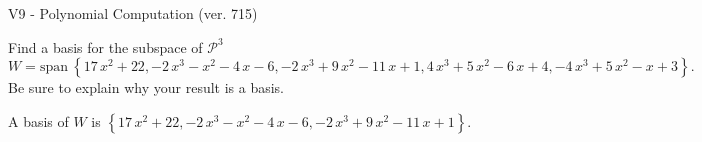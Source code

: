 \begin{exercise}
  \begin{exerciseTitle}V9 - Polynomial Computation (ver. 715)\end{exerciseTitle}
  \begin{exerciseStatement}
    Find a basis for the subspace of \(\mathcal{P}^3\) 
\[W=\mathrm{span}\ \left\{17 \, x^{2} + 22 , -2 \, x^{3} - x^{2} - 4 \, x - 6 , -2 \, x^{3} + 9 \, x^{2} - 11 \, x + 1 , 4 \, x^{3} + 5 \, x^{2} - 6 \, x + 4 , -4 \, x^{3} + 5 \, x^{2} - x + 3\right\}.\]
 Be sure to explain why your result is a basis.


  \end{exerciseStatement}
  \begin{exerciseAnswer}
   A basis of \(W\) is  \(\left\{17 \, x^{2} + 22 , -2 \, x^{3} - x^{2} - 4 \, x - 6 , -2 \, x^{3} + 9 \, x^{2} - 11 \, x + 1\right\}\).
  


  \end{exerciseAnswer}
\end{exercise}